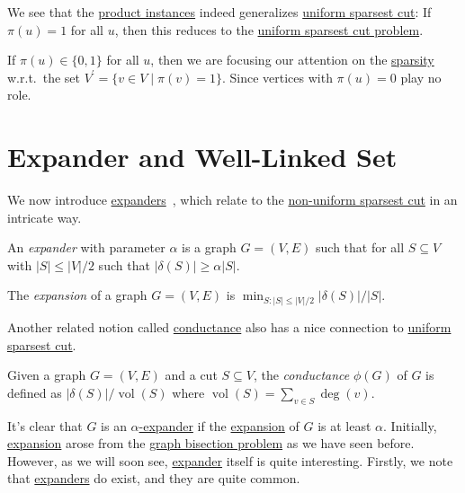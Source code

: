 We see that the \hyperref[prb:product-instance-of-sparsest-cut]{product instances} indeed generalizes \hyperref[prb:sparsest-cut]{uniform sparsest cut}: If \(\pi (u) = 1\) for all \(u\), then this reduces to the \hyperref[prb:sparsest-cut]{uniform sparsest cut problem}.

\begin{remark}
	If \(\pi (u) \in \{ 0, 1 \} \) for all \(u\), then we are focusing our attention on the \hyperref[def:sparsity]{sparsity} w.r.t.\ the set \(V^{\prime} = \{ v \in V \mid \pi (v) = 1 \} \). Since vertices with \(\pi (u) = 0\) play no role.
\end{remark}

\section{Expander and Well-Linked Set}
We now introduce \hyperref[def:expander]{expanders}~\cite{hoory2006expander}, which relate to the \hyperref[prb:non-uniform-sparsest-cut]{non-uniform sparsest cut} in an intricate way.

\begin{definition}[Expander]\label{def:expander}
	An \emph{expander} with parameter \(\alpha \) is a graph \(G = (V, E)\) such that for all \(S \subseteq V\) with \(\lvert S \rvert \leq \lvert V \rvert / 2\) such that \(\lvert \delta (S) \rvert \geq \alpha \lvert S \rvert\).
\end{definition}

\begin{definition}[Expansion]\label{def:expansion}
	The \emph{expansion} of a graph \(G = (V, E)\) is \(\min _{S\colon \lvert S \rvert \leq \lvert V \rvert / 2} \lvert \delta (S) \rvert / \lvert S \rvert \).
\end{definition}

Another related notion called \hyperref[def:conductance]{conductance} also has a nice connection to \hyperref[prb:sparsest-cut]{uniform sparsest cut}.

\begin{definition}[Conductance]\label{def:conductance}
	Given a graph \(G = (V, E)\) and a cut \(S \subseteq V\), the \emph{conductance} \(\phi (G)\) of \(G\) is defined as \(\lvert \delta (S) \rvert / \operatorname{vol}(S) \) where \(\operatorname{vol}(S) = \sum_{v \in S} \deg(v)\).
\end{definition}

It's clear that \(G\) is an \hyperref[def:expander]{\(\alpha \)-expander} if the \hyperref[def:expansion]{expansion} of \(G\) is at least \(\alpha \). Initially, \hyperref[def:expansion]{expansion} arose from the \hyperref[prb:graph-bisection]{graph bisection problem} as we have seen before. However, as we will soon see, \hyperref[def:expander]{expander} itself is quite interesting. Firstly, we note that \hyperref[def:expander]{expanders} do exist, and they are quite common.


